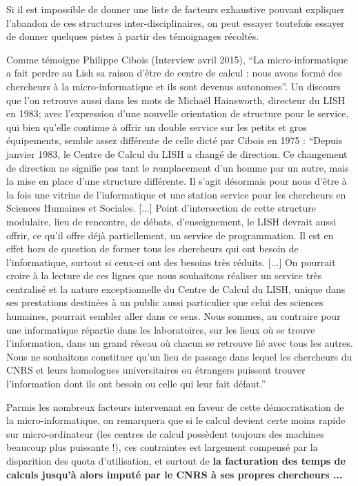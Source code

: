 Si il est impossible de donner une liste de facteurs exhaustive pouvant expliquer l'abandon de ces structures inter-disciplinaires, on peut essayer toutefois essayer de donner quelques pistes à partir des témoignages récoltés. 

Comme témoigne Philippe Cibois (Interview avril 2015), \enquote{La micro-informatique a fait perdre au Lish sa raison d'être de centre de calcul : nous avons formé des chercheurs à la micro-informatique et ils sont devenus autonomes}. Un discours que l’on retrouve aussi dans les mots de Michaël Hainsworth, directeur du LISH en 1983; avec l’expression d’une nouvelle orientation de structure pour le service, qui bien qu’elle continue à offrir un double service sur les petits et gros équipements, semble assez différente de celle dicté par Cibois en 1975 : \enquote{Depuis janvier 1983, le Centre de Calcul du LISH a changé de direction. Ce changement de direction ne signifie pas tant le remplacement d'un homme par un autre, mais la mise en place d'une structure différente. Il s'agit désormais pour nous d'être à la fois une vitrine de l'informatique et une station service pour les chercheurs en Sciences Humaines et Sociales. [...] Point d'intersection de cette structure modulaire, lieu de rencontre, de débats, d'enseignement, le LISH devrait aussi offrir, ce qu'il offre déjà partiellement, un service de programmation. Il est en effet hors de question de former tous les chercheurs qui ont besoin de l'informatique, surtout si ceux-ci ont des besoins très réduits. [...] On pourrait croire à la lecture de ces lignes que nous souhaitons réaliser un service très centralisé et la nature exceptionnelle du Centre de Calcul du LISH, unique dans ses prestations destinées à un public aussi particulier que celui des sciences humaines, pourrait sembler aller dans ce sens. Nous sommes, au contraire pour une informatique répartie dans les laboratoires, sur les lieux où se trouve l'information, dans un grand réseau où chacun se retrouve lié avec tous les autres. Nous ne souhaitons constituer qu'un lieu de passage dans lequel les chercheurs du CNRS et leurs homologues universitaires ou étrangers puissent trouver l'information dont ils ont besoin ou celle qui leur fait défaut.}

Parmis les nombreux facteurs intervenant en faveur de cette démocratisation de la micro-informatique, on remarquera que si le calcul devient certe moins rapide sur micro-ordinateur (les centres de calcul possèdent toujours des machines beaucoup plus puissante !), ces contraintes est largement compensé par la disparition des quota d'utilisation, et surtout de \textbf{la facturation des temps de calculs jusqu’à alors imputé par le CNRS à ses propres chercheurs ...}

